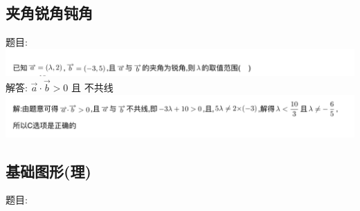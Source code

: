 \documentclass[hyperref, UTF8,11pt,a4paper]{ctexart} %
\begin{document}

\subsection{夹角锐角钝角}
{\color{red}  题目: } \\
\includegraphics[width=500pt]  {pic/xiangliang/jiajiaotimu.jpg} \\
解答: {\color{blue}  $\vec{a} \cdot \vec{b}>0$ 且 不共线} \\
\includegraphics[width=500pt]  {pic/xiangliang/jiajiaojieda.jpg} \\


\subsection{基础图形(理)}
{\color{red}  题目: } \\


\end{document}
